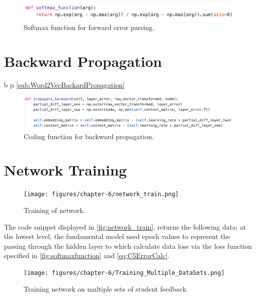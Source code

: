 \begin{figure}[H]
    \centering
    \includegraphics[width=\textwidth]{figures/chapter-6/softmaxfunction.png}
    \caption[Softmax function for forward error parsing]{Softmax function for forward error parsing.
    \label{fig:softmaxfunction}}
\end{figure}

\section{Backward Propagation}

b p \autoref{sub:Word2VecBackardPropagation}

\begin{figure}[H]
    \centering
    \includegraphics[width=\textwidth]{figures/chapter-6/backwardpropagation.png}
    \caption[Coding function for backward propagation]{Coding function for backward propagation.
    \label{fig:backwardpropagation}}
\end{figure}

\section{Network Training}

\begin{figure}[H]
    \centering
    \texttt{[image: figures/chapter-6/network\_train.png]}
    \caption[Training of network]{Training of network.
    \label{fig:network_train}}
\end{figure}

The code snippet displayed in \autoref{fig:network_train}, returns the following data; at the lowest level, the fundamental model used epoch values to represent the passing through the hidden layer to which calculate data loss via the loss function specified in \autoref{fig:softmaxfunction} and \autoref{eq:C5ErrorCalc}.

\begin{figure}[H]
    \centering
    \texttt{[image: figures/chapter-6/Training\_Multiple\_DataSets.png]}
    \caption[Training network on multiple sets of student feedback]{Training network on multiple sets of student feedback.
    \label{fig:Training_Multiple_DataSets}}
\end{figure}

